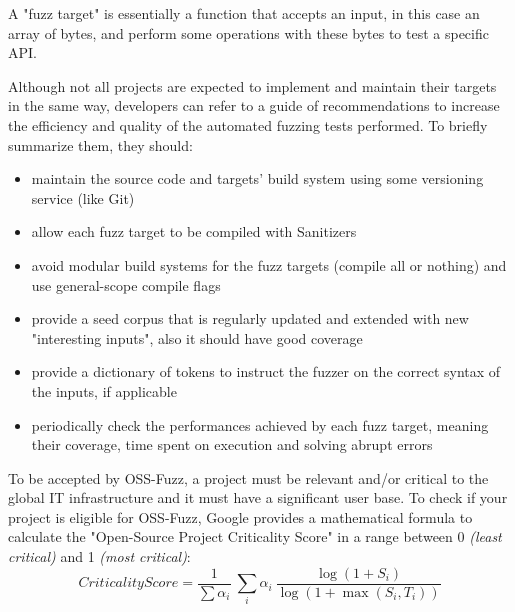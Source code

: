 A "fuzz target" is essentially a function that accepts an input, in this case an array of bytes, and perform some operations with these bytes to test a specific API.

Although not all projects are expected to implement and maintain their targets in the same way, developers can refer to a guide of recommendations to increase the efficiency and quality of the automated fuzzing tests performed.
To briefly summarize them, they should:
\begin{itemize}
    \item maintain the source code and targets' build system using some versioning service (like Git)
    \item allow each fuzz target to be compiled with Sanitizers
    \item avoid modular build systems for the fuzz targets (compile all or nothing) and use general-scope compile flags
    \item provide a seed corpus that is regularly updated and extended with new "interesting inputs", also it should have good coverage
    \item provide a dictionary of tokens to instruct the fuzzer on the correct syntax of the inputs, if applicable
    \item periodically check the performances achieved by each fuzz target, meaning their coverage, time spent on execution and solving abrupt errors
\end{itemize}

To be accepted by OSS-Fuzz, a project must be relevant and/or critical to the global IT infrastructure and it must have a significant user base.
To check if your project is eligible for OSS-Fuzz, Google provides a mathematical formula to calculate the "Open-Source Project Criticality Score" \cite{score} in a range between 0 \textit{(least critical)} and 1 \textit{(most critical)}:
\ \\ 

\begin{equation}
    CriticalityScore = \frac{1}{\sum \alpha_i}\  \sum_i \alpha_i \ \frac{\log(1+S_i)}{\log(1+\max(S_i,T_i))}
\end{equation}
\ \\ 

